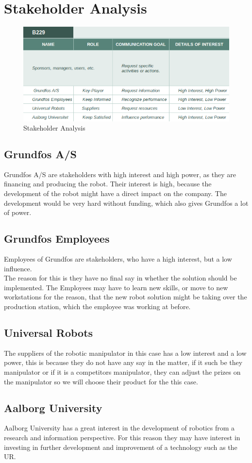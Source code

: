 \chapter{Stakeholder Analysis} \label{ch:Stakeholder Analysis}

\begin{figure}[h]
    \centering
    \includegraphics[scale=0.65]{StakeholderAnalysis/Stakeholder.png}
    \caption{Stakeholder Analysis} 
    \label{fig:Stakeholder} 
\end{figure}

\section{Grundfos A/S}\label{ch:grundfosas-stake}
Grundfos A/S are stakeholders with high interest and high power, as they are financing and producing the robot. Their interest is high, because the development of the robot might have a direct impact on the company. The development would be very hard without funding, which also gives Grundfos a lot of power. 



\section{Grundfos Employees}\label{ch:grundfosemp-stake}
Employees of Grundfos are stakeholders, who have a high interest, but a low influence.\\ The reason for this is they have no final say in whether the solution should be implemented. The Employees may have to learn new skills, or move to new workstations for the reason, that the new robot solution might be taking over the production station, which the employee was working at before.


\section{Universal Robots}\label{ch:Universalrobots-stake}
The suppliers of the robotic manipulator in this case has a low interest and a low power, this is because they do not have any say in the matter, if it such be they manipulator or if it is a competitors manipulator, they can adjust the prizes on the manipulator so we will choose their product for the this case. 


\section{Aalborg University}\label{ch:Aau-stake}
Aalborg University has a great interest in the development of robotics from a research and information perspective. For this reason they may have interest in investing in further development and improvement of a technology such as the UR. 